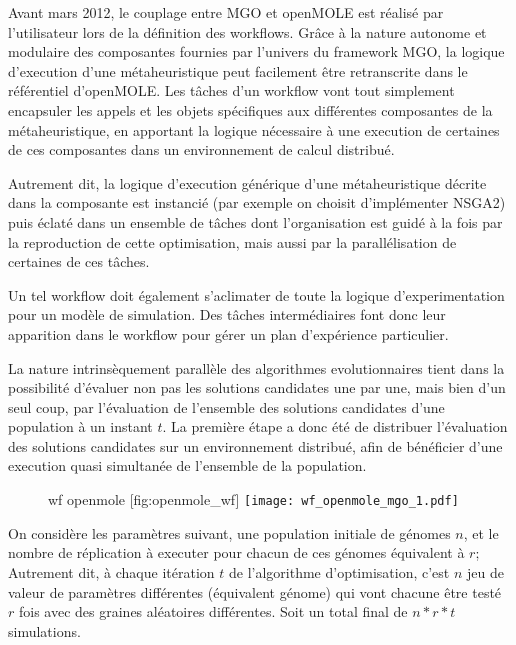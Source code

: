Avant mars 2012, le couplage entre MGO et openMOLE est réalisé par l'utilisateur lors de la définition des workflows. Grâce à la nature autonome et modulaire des composantes fournies par l'univers du framework MGO, la logique d'execution d'une métaheuristique peut facilement être retranscrite dans le référentiel d'openMOLE. Les tâches d'un workflow vont tout simplement encapsuler les appels et les objets spécifiques aux différentes composantes de la métaheuristique, en apportant la logique nécessaire à une execution de certaines de ces composantes dans un environnement de calcul distribué.

Autrement dit, la logique d'execution générique d'une métaheuristique décrite dans la composante  est instancié (par exemple on choisit d'implémenter NSGA2) puis éclaté dans un ensemble de tâches dont l'organisation est guidé à la fois par la reproduction de cette optimisation, mais aussi par la parallélisation de certaines de ces tâches.

Un tel workflow doit également s'aclimater de toute la logique d'experimentation pour un modèle de simulation. Des tâches intermédiaires font donc leur apparition dans le workflow pour gérer un plan d'expérience particulier.

La nature intrinsèquement parallèle des algorithmes evolutionnaires tient dans la possibilité d'évaluer non pas les solutions candidates une par une, mais bien d'un seul coup, par l'évaluation de l'ensemble des solutions candidates d'une population à un instant $t$. La première étape a donc été de distribuer l'évaluation des solutions candidates sur un environnement distribué, afin de bénéficier d'une execution quasi simultanée de l'ensemble de la population.

\begin{figure}[H]
	\begin{sidecaption}[fortoc]{wf openmole }[fig:openmole_wf]
		\centering
		\texttt{[image: wf\_openmole\_mgo\_1.pdf]}{
		}
  \end{sidecaption}
\end{figure}

On considère les paramètres suivant, une population initiale de génomes $n$, et le nombre de réplication à executer pour chacun de ces génomes équivalent à $r$; Autrement dit, à chaque itération $t$ de l'algorithme d'optimisation, c'est $n$ jeu de valeur de paramètres différentes (équivalent génome) qui vont chacune être testé $r$ fois avec des graines aléatoires différentes. Soit un total final de $n * r * t$ simulations.

